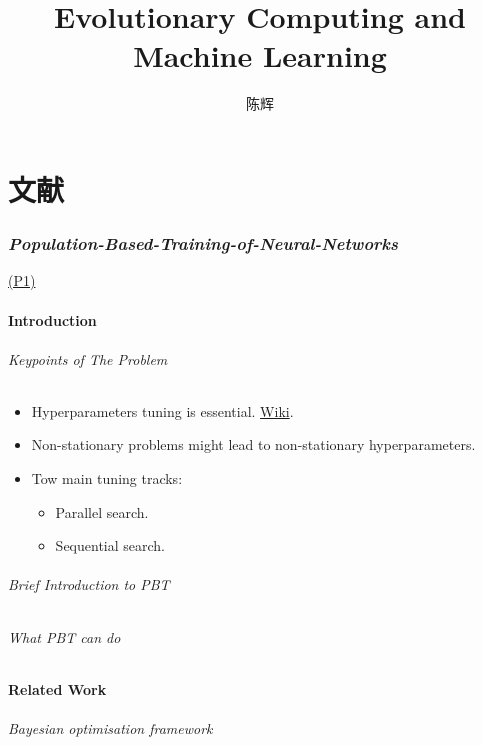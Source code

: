 \documentclass{article}
\title{Evolutionary Computing and Machine Learning}
\author{陈辉}
\date{}
\newcommand{\paper}[2]{\hyperlink{./papers/#1.pdf.#2}{(P#2)}}
\begin{document}
\maketitle
\tableofcontents
\newpage
\part{文献}
\section{\textit{Population-Based-Training-of-Neural-Networks}}
\paper{Population-Based-Training-of-Neural-Networks}{1}
\subsection{Introduction}
\paragraph{Keypoints of The Problem}

\begin{itemize}
		\item Hyperparameters tuning is essential.
		\href{https://en.wikipedia.org/wiki/Hyperparameter\_optimization}{Wiki}.
		\item Non-stationary problems might lead to non-stationary hyperparameters.
		\item Tow main tuning tracks:
\begin{itemize}
		\item Parallel search. 
		\item Sequential search.
\end{itemize}
\end{itemize}

\paragraph{Brief Introduction to PBT}
\paragraph{What PBT can do}

\subsection{Related Work}
\paragraph{Bayesian optimisation framework}
\end{document}
